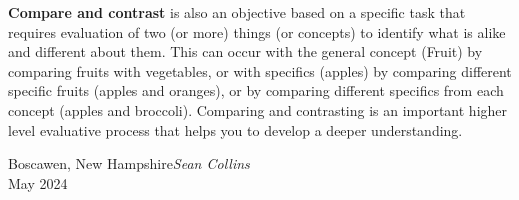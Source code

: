 \textbf{Compare and contrast} is also an objective based on a specific task that requires evaluation of two (or more) things (or concepts) to identify what is alike and different about them. This can occur with the general concept (Fruit) by comparing fruits with vegetables, or with specifics (apples) by comparing different specific fruits (apples and oranges), or by comparing different specifics from each concept (apples and broccoli). Comparing and contrasting is an important higher level evaluative process that helps you to develop a deeper understanding.

\vspace{\baselineskip}
\begin{flushright}\noindent
Boscawen, New Hampshire\hfill {\it Sean  Collins}\\
May 2024\hfill {\it \hspace{1cm} }\\
\end{flushright}


